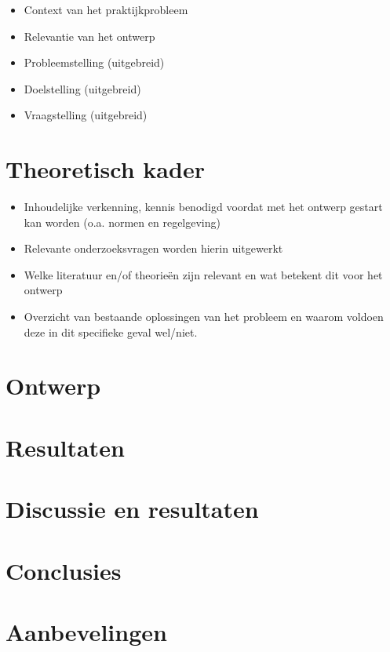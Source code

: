 \documentclass[10pt,a4paper]{article}
\begin{document}
\begin{itemize}
\setlength\itemsep{0em}
\item Context van het praktijkprobleem 
\item Relevantie van het ontwerp
\item Probleemstelling (uitgebreid) 
\item Doelstelling (uitgebreid) 
\item Vraagstelling (uitgebreid)
\end{itemize}

\newpage

\section{Theoretisch kader}
\begin{itemize}
\setlength\itemsep{0em}
\item Inhoudelijke verkenning, kennis benodigd voordat met het ontwerp gestart kan worden (o.a. normen en regelgeving)
\item Relevante onderzoeksvragen worden hierin uitgewerkt 
\item Welke literatuur en/of theorieën zijn relevant en wat betekent dit voor het ontwerp \item Overzicht van bestaande oplossingen van het probleem en waarom voldoen deze in dit specifieke geval wel/niet.
\end{itemize}
\newpage

\section{Ontwerp}

\newpage

\iffalse %

\section{Resultaten}
\section{Discussie en resultaten}
\section{Conclusies}
\section{Aanbevelingen}
\end{document}
